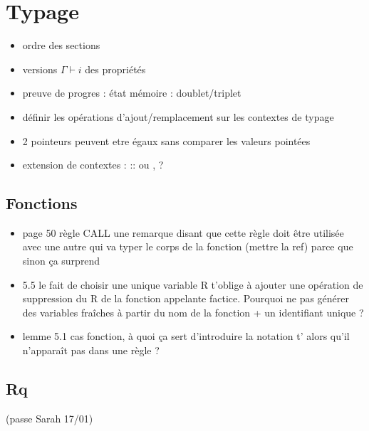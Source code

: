 \section{Typage}%

\begin{itemize}
\item ordre des sections
\item versions $Γ ⊢ i$ des propriétés
\item preuve de progres : état mémoire : doublet/triplet
\item définir les opérations d'ajout/remplacement sur les contextes de typage
\item 2 pointeurs peuvent etre égaux sans comparer les valeurs pointées
\item extension de contextes : :: ou , ?
\end{itemize}

\subsection*{Fonctions}

\begin{itemize}
\item
  page 50 règle CALL une remarque disant que cette règle doit être
  utilisée avec une autre qui va typer le corps de la fonction (mettre
  la ref) parce que sinon ça surprend
\item
  5.5 le fait de choisir une unique variable R t'oblige à ajouter une
  opération de suppression du R de la fonction appelante factice.
  Pourquoi ne pas générer des variables fraîches à partir du nom de la
  fonction + un identifiant unique ?
\item
  lemme 5.1 cas fonction, à quoi ça sert d'introduire la notation t'
  alors qu'il n'apparaît pas dans une règle ?
\end{itemize}

\subsection*{Rq}
(passe Sarah 17/01)

